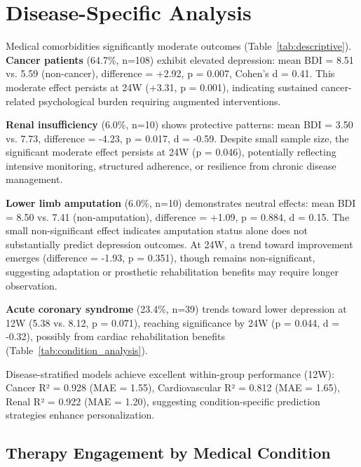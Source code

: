 \documentclass[conference]{IEEEtran}
\begin{document}
\section{Disease-Specific Analysis}

Medical comorbidities significantly moderate outcomes (Table~\ref{tab:descriptive}). \textbf{Cancer patients} (64.7\%, n=108) exhibit elevated depression: mean BDI = 8.51 vs. 5.59 (non-cancer), difference = +2.92, p = 0.007, Cohen's d = 0.41. This moderate effect persists at 24W (+3.31, p = 0.001), indicating sustained cancer-related psychological burden requiring augmented interventions.

\textbf{Renal insufficiency} (6.0\%, n=10) shows protective patterns: mean BDI = 3.50 vs. 7.73, difference = -4.23, p = 0.017, d = -0.59. Despite small sample size, the significant moderate effect persists at 24W (p = 0.046), potentially reflecting intensive monitoring, structured adherence, or resilience from chronic disease management.

\textbf{Lower limb amputation} (6.0\%, n=10) demonstrates neutral effects: mean BDI = 8.50 vs. 7.41 (non-amputation), difference = +1.09, p = 0.884, d = 0.15. The small non-significant effect indicates amputation status alone does not substantially predict depression outcomes. At 24W, a trend toward improvement emerges (difference = -1.93, p = 0.351), though remains non-significant, suggesting adaptation or prosthetic rehabilitation benefits may require longer observation.

\textbf{Acute coronary syndrome} (23.4\%, n=39) trends toward lower depression at 12W (5.38 vs. 8.12, p = 0.071), reaching significance by 24W (p = 0.044, d = -0.32), possibly from cardiac rehabilitation benefits (Table~\ref{tab:condition_analysis}).

Disease-stratified models achieve excellent within-group performance (12W): Cancer R² = 0.928 (MAE = 1.55), Cardiovascular R² = 0.812 (MAE = 1.65), Renal R² = 0.922 (MAE = 1.20), suggesting condition-specific prediction strategies enhance personalization.

\subsection{Therapy Engagement by Medical Condition}
\end{document}
